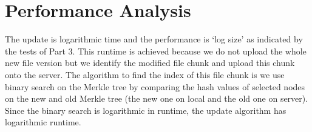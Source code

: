 \documentclass[a4paper, 11pt]{article}
\begin{document}
\section*{Performance Analysis}
The update is logarithmic time and the performance is `log size' as indicated by the tests of Part 3. This runtime is achieved because we do not upload the whole new file version but we identify the modified file chunk and upload this chunk onto the server. The algorithm to find the index of this file chunk is we use binary search on the Merkle tree by comparing the hash values of selected nodes on the new and old Merkle tree (the new one on local and the old one on server). Since the binary search is logarithmic in runtime, the update algorithm has logarithmic runtime. 
\end{document}
